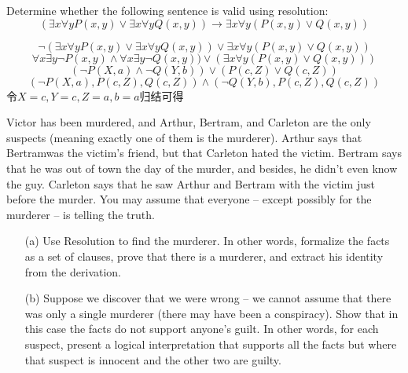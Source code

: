 \documentclass[a4paper, 11pt]{article}
\begin{document}
\begin{question}\normalfont
    Determine whether the following sentence is valid using resolution:
    \[(\exists x\forall y P(x,y)\lor\exists x\forall y Q(x,y))\to
    \exists x\forall y(P(x,y)\lor Q(x,y))\]
\end{question}
\begin{answer}
    \[\lnot(\exists x\forall y P(x,y)\lor\exists x\forall y Q(x,y))\lor \exists x\forall y(P(x,y)\lor Q(x,y))\]
    \[\forall x\exists y \lnot P(x,y)\land\forall x\exists y \lnot Q(x,y))\lor (\exists x\forall y(P(x,y)\lor Q(x,y)))\]
    \[(\lnot P(X,a)\land \lnot Q(Y,b))\lor (P(c,Z)\lor Q(c,Z))\]
    \[(\lnot P(X,a),P(c,Z),Q(c,Z))\land (\lnot Q(Y,b),P(c,Z),Q(c,Z))\]
    令$X=c,Y=c,Z=a,b=a$归结可得
\end{answer}

\begin{question}\normalfont
    Victor has been murdered, and Arthur, Bertram, and Carleton are the only suspects (meaning exactly one of them is the murderer). Arthur says that Bertramwas the victim's friend, but that Carleton hated the victim. Bertram says that he was out of town the day of the murder, and besides, he didn't even know the guy. Carleton says that he saw Arthur and Bertram with the victim just before the murder. You may assume that everyone – except possibly for the murderer – is telling the truth.
    \begin{itemize}
    \item [(a)] Use Resolution to find the murderer. In other words, formalize the facts as a set of clauses, prove that there is a murderer, and extract his identity from the derivation.
    \item [(b)] Suppose we discover that we were wrong – we cannot assume that there was only a single murderer (there may have been a conspiracy). Show that in this case the facts do not support anyone's guilt. In other words, for each suspect, present a logical interpretation that supports all the facts but where that suspect is innocent and the other two are guilty.
    \end{itemize}
\end{question}
\begin{answer}

\end{answer}
\end{document}

